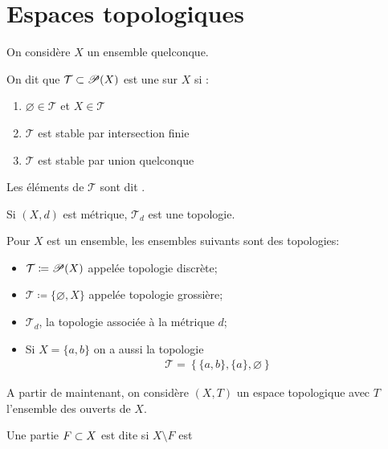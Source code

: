 \documentclass[french,a4paper,10pt]{article}
\begin{document}
	\section{Espaces topologiques}
	On considère $X$ un ensemble quelconque.
	
	\begin{definition}
		On dit que $\mathcal{T}\subset\mathscr{P}(X)$ est une  sur $X$ si :
		\begin{enumerate}[label=$(\roman*)$]
			\item $\varnothing\in \mathcal{T}$ et $X\in\mathcal{T}$
			
			\item $\mathcal{T}$ est stable par intersection finie
			
			\item $\mathcal{T}$ est stable par union quelconque
		\end{enumerate}
		Les éléments de $\mathcal{T}$ sont dit .
	\end{definition}
	
	\begin{example}
		Si $(X,d)$ est métrique, $\mathcal{T}_d$ est une topologie.
	\end{example}
	
	
	\begin{example}
		Pour $X$ est un ensemble, les ensembles suivants sont des topologies:
		\begin{itemize}
			\item $\mathcal{T} \coloneq \mathscr{P}(X)$ appelée topologie discrète;
			\item $\mathcal{T}\coloneq\{\varnothing, X\}$ appelée topologie grossière;
			\item $\mathcal{T}_d$, la topologie associée à la métrique $d$;
			\item Si $X=\{a,b\}$ on a aussi la topologie
			\[\begin{aligned}
				\mathcal{T}=\left\{\{a,b\}, \{a\}, \varnothing\right\}
			\end{aligned}\]
		\end{itemize}
	\end{example}
	
	
	
	A partir de maintenant, on considère $(X, T)$ un espace topologique avec $T$ l'ensemble des ouverts de $X$.
	
	\begin{definition}
		Une partie $F\subset X$ est dite  si $X\setminus F$ est \defemph{ouvert}
	\end{definition}
	
\end{document}
